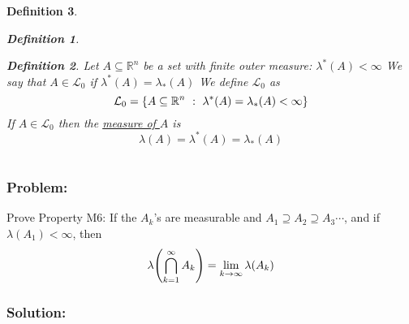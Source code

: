 \documentclass[]{article}
\newcommand{\R}{\mathbb{R}}
\newcommand{\st}{\ : \ }
\newtheorem{definition}{Definition}
\begin{document}
\begin{definition}
\begin{enumerate}
\begin{definition}
            \end{definition}
            \begin{definition}
                Let $A\subseteq \R^n$ be a set with finite outer measure: 
                    $\lambda^*(A) < \infty$
                We say that $A \in \mathcal{L}_0$ if $\lambda^*(A) = \lambda_*(A)$
                We define $\mathcal{L}_0$ as \[
                    \mathcal{L}_0 = \qty{
                        A \subseteq \R^n \st \lambda^*(A) = \lambda_*(A) < \infty
                    }
                \] If $A \in \mathcal{L}_0$ then the \emph{\underline{measure of $A$}} is \[
                    \lambda(A) = \lambda^*(A) = \lambda_*(A)
                \]
            \end{definition}
    \end{enumerate}
\end{definition}










\newpage
\section{}
\subsection{}
\subsubsection*{Problem:}
Prove Property M6: 
If the $A_k$'s are measurable and $A_1 \supseteq A_2 \supseteq A_3 \cdots$, 
and if $\lambda(A_1) < \infty$, 
then \[
    \lambda \qty(
        \bigcap_{k=1}^{\infty} A_k
    ) = \lim_{k \to \infty} \lambda(A_k)
\]
\subsubsection*{Solution:}
\end{document}

